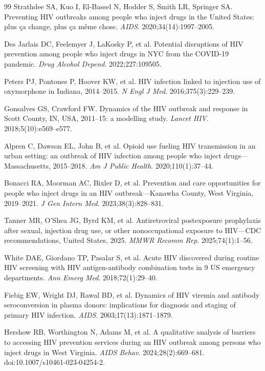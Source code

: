 \documentclass[12pt]{article}
\begin{document}
\begin{thebibliography}{99}
 Strathdee SA, Kuo I, El-Bassel N, Hodder S, Smith LR, Springer SA. Preventing HIV outbreaks among people who inject drugs in the United States: plus ça change, plus ça même chose. \textit{AIDS}. 2020;34(14):1997--2005.

 Des Jarlais DC, Feelemyer J, LaKosky P, et al. Potential disruptions of HIV prevention among people who inject drugs in NYC from the COVID-19 pandemic. \textit{Drug Alcohol Depend}. 2022;227:109505.

 Peters PJ, Pontones P, Hoover KW, et al. HIV infection linked to injection use of oxymorphone in Indiana, 2014--2015. \textit{N Engl J Med}. 2016;375(3):229--239.

 Gonsalves GS, Crawford FW. Dynamics of the HIV outbreak and response in Scott County, IN, USA, 2011--15: a modelling study. \textit{Lancet HIV}. 2018;5(10):e569--e577.

 Alpren C, Dawson EL, John B, et al. Opioid use fueling HIV transmission in an urban setting: an outbreak of HIV infection among people who inject drugs---Massachusetts, 2015--2018. \textit{Am J Public Health}. 2020;110(1):37--44.

 Bonacci RA, Moorman AC, Bixler D, et al. Prevention and care opportunities for people who inject drugs in an HIV outbreak---Kanawha County, West Virginia, 2019--2021. \textit{J Gen Intern Med}. 2023;38(3):828--831.


 Tanner MR, O'Shea JG, Byrd KM, et al. Antiretroviral postexposure prophylaxis after sexual, injection drug use, or other nonoccupational exposure to HIV---CDC recommendations, United States, 2025. \textit{MMWR Recomm Rep}. 2025;74(1):1--56.

 White DAE, Giordano TP, Pasalar S, et al. Acute HIV discovered during routine HIV screening with HIV antigen-antibody combination tests in 9 US emergency departments. \textit{Ann Emerg Med}. 2018;72(1):29--40.

 Fiebig EW, Wright DJ, Rawal BD, et al. Dynamics of HIV viremia and antibody seroconversion in plasma donors: implications for diagnosis and staging of primary HIV infection. \textit{AIDS}. 2003;17(13):1871--1879.

 Hershow RB, Worthington N, Adams M, et al. A qualitative analysis of barriers to accessing HIV prevention services during an HIV outbreak among persons who inject drugs in West Virginia. \textit{AIDS Behav}. 2024;28(2):669--681. doi:10.1007/s10461-023-04254-2.


\end{thebibliography}
\end{document}
